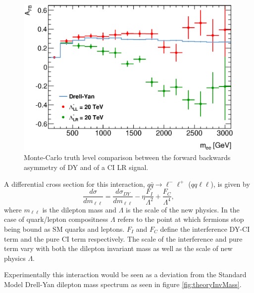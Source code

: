         \begin{figure}[h]
            \begin{center}
            \includegraphics[width=0.9\linewidth]{images/AFB_MC.eps}
            \end{center}
            \caption{Monte-Carlo truth level comparison between the forward backwards asymmetry of DY and of a CI LR signal.}
            \label{fig:theoryAFB}
        \end{figure}

        A differential cross section for this interaction, $q\bar{q} \rightarrow \ell^{-}\ell^{+}$ ($qq\ell\ell$), is given by
        \begin{equation}
            \frac{d\sigma}{dm_{\ell\ell}} = 
                \frac{d\sigma_{DY}}{dm_{\ell\ell}} 
                - \eta\frac{F_{I}}{\Lambda^{2}} 
                + \frac{F_{C}}{\Lambda^{4}},
            \label{eq:DiffCross}
        \end{equation}
        where $m_{\ell\ell}$ is the dilepton mass and $\Lambda$ is the scale of the new physics. In the case of quark/lepton compositness $\Lambda$ refers to the point at which fermions stop being bound as SM quarks and leptons. $F_{I}$ and $F_{C}$ define the interference DY-CI term and the pure CI term respectively. The scale of the interference and pure term vary with both the dilepton invariant mass as well as the scale of new physics $\Lambda$.

        Experimentally this interaction would be seen as a deviation from the Standard Model Drell-Yan dilepton mass spectrum as seen in figure \ref{fig:theoryInvMass}. 

